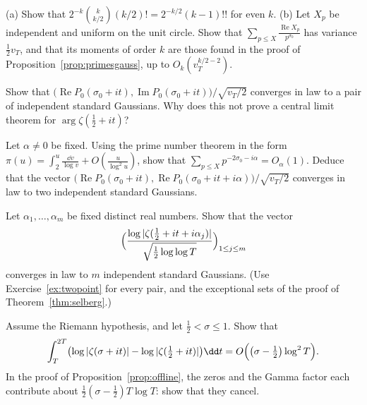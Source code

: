 \begin{exercise}[$\star$]\label{ex:half}
(a) Show that $2^{-k}\binom k{k/2}(k/2)!=2^{-k/2}(k-1)!!$ for even $k$. (b) Let $X_p$ be independent and uniform on the unit circle. Show that $\sum_{p\le X}\frac{\operatorname{Re}X_p}{p^{\sigma_0}}$ has variance $\frac12v_T$, and that its moments of order $k$ are those found in the proof of Proposition~\ref{prop:primesgauss}, up to $O_k(v_T^{k/2-2})$.
\end{exercise}

\begin{exercise}[$\star\star$]\label{ex:complexgauss}
Show that $\bigl(\operatorname{Re}P_0(\sigma_0+it),\operatorname{Im}P_0(\sigma_0+it)\bigr)/\sqrt{v_T/2}$ converges in law to a pair of independent standard Gaussians. Why does this not prove a central limit theorem for $\arg\zeta(\frac12+it)$?
\end{exercise}

\begin{exercise}[$\star\star\star$]\label{ex:twopoint}
Let $\alpha\ne0$ be fixed. Using the prime number theorem in the form $\pi(u)=\int_2^u\frac{\dd v}{\log v}+O(\frac u{\log^2u})$, show that $\sum_{p\le X}p^{-2\sigma_0-i\alpha}=O_\alpha(1)$. Deduce that the vector $\bigl(\operatorname{Re}P_0(\sigma_0+it),\operatorname{Re}P_0(\sigma_0+it+i\alpha)\bigr)/\sqrt{v_T/2}$ converges in law to two independent standard Gaussians.
\end{exercise}

\begin{exercise}[$\star\star\star$]\label{ex:multipoint}
Let $\alpha_1,\dots,\alpha_m$ be fixed distinct real numbers. Show that the vector
\[
\Bigl(\frac{\log|\zeta(\frac12+it+i\alpha_j)|}{\sqrt{\frac12\log\log T}}\Bigr)_{1\le j\le m}
\]
converges in law to $m$ independent standard Gaussians. (Use Exercise~\ref{ex:twopoint} for every pair, and the exceptional sets of the proof of Theorem~\ref{thm:selberg}.)
\end{exercise}

\begin{exercise}[$\star\star\star$]\label{ex:meandiff}
Assume the Riemann hypothesis, and let $\frac12<\sigma\le1$. Show that
\[
\int_T^{2T}\bigl(\log|\zeta(\sigma+it)|-\log|\zeta(\tfrac12+it)|\bigr)\dd t=O\Bigl(\bigl(\sigma-\tfrac12\bigr)\log^2T\Bigr).
\]
In the proof of Proposition~\ref{prop:offline}, the zeros and the Gamma factor each contribute about $\frac12(\sigma-\frac12)T\log T$: show that they cancel.
\end{exercise}

